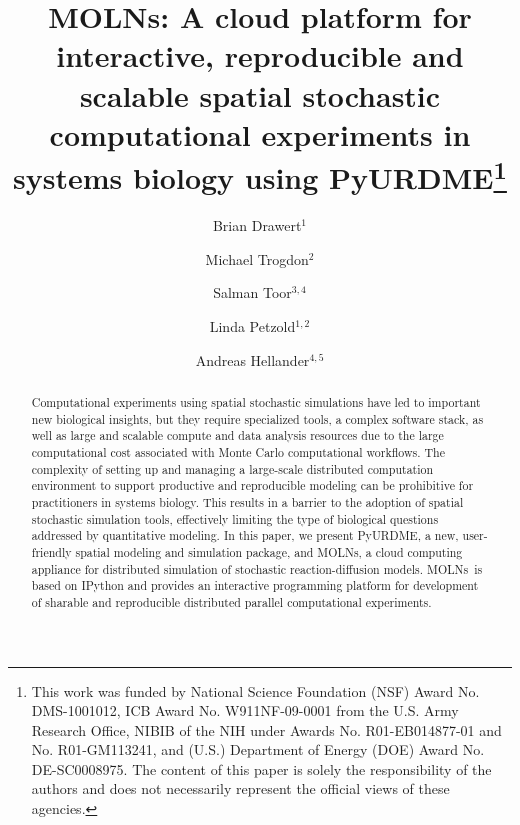 \documentclass[final,leqno,onefignum,onetabnum]{siamltex1213}
\def\packagename {MOLNs}
\begin{document}
\title{MOLNs: A cloud platform for interactive, reproducible and scalable spatial stochastic computational experiments in systems biology using PyURDME\thanks{This work was funded by National Science Foundation (NSF) Award No. DMS-1001012, ICB Award No. W911NF-09-0001 from the U.S. Army Research Office, NIBIB of the NIH under Awards No. R01-EB014877-01 and No. R01-GM113241, and (U.S.) Department of Energy (DOE) Award No. DE-SC0008975. The content of this paper is solely the responsibility of the authors and does not necessarily represent the official views of these agencies.
}}


\author{Brian Drawert$^{1}$
\and Michael Trogdon$^{2}$
\and Salman Toor$^{3,4}$
\and Linda Petzold$^{1,2}$
\and Andreas Hellander$^{4,5}$
}
\maketitle
{}



\begin{abstract}
Computational experiments using spatial stochastic simulations have led to important new biological insights, but they require specialized tools, a complex software stack, as well as large and scalable compute and data analysis resources due to the large computational cost associated with Monte Carlo computational workflows. The complexity of setting up and managing a large-scale distributed computation environment to support productive and reproducible modeling can be prohibitive for practitioners in systems biology. This results in a barrier to the adoption of spatial stochastic simulation tools, effectively limiting the type of biological questions addressed by quantitative modeling. 
In this paper, we present PyURDME, a new, user-friendly spatial modeling and simulation package, and \packagename, a cloud computing appliance for distributed simulation of stochastic reaction-diffusion models.
\packagename~is based on IPython and provides an interactive programming platform for development of sharable and reproducible distributed parallel computational experiments. 
\end{abstract}
\end{document}
